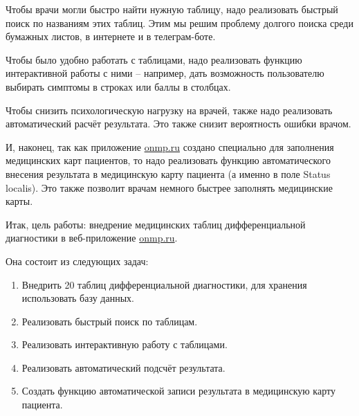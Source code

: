 Чтобы врачи могли быстро найти нужную таблицу, надо реализовать быстрый поиск по названиям этих таблиц. Этим мы решим проблему долгого поиска среди бумажных листов, в интернете и в телеграм-боте.

Чтобы было удобно работать с таблицами, надо реализовать функцию интерактивной работы с ними -- например, дать возможность пользователю выбирать симптомы в строках или баллы в столбцах.

Чтобы снизить психологическую нагрузку на врачей, также надо реализовать автоматический расчёт результата. Это также снизит вероятность ошибки врачом.

И, наконец, так как приложение \url{onmp.ru} создано специально для заполнения медицинских карт пациентов, то надо реализовать функцию автоматического внесения результата в медицинскую карту пациента (а именно в поле Status localis). Это также позволит врачам немного быстрее заполнять медицинские карты.

Итак, цель работы: внедрение медицинских таблиц дифференциальной диагностики в веб-приложение \url{onmp.ru}.

Она состоит из следующих задач:

\begin{enumerate}
  \item Внедрить 20 таблиц дифференциальной диагностики, для хранения использовать базу данных.
  \item Реализовать быстрый поиск по таблицам.
  \item Реализовать интерактивную работу с таблицами.
  \item Реализовать автоматический подсчёт результата.
  \item Создать функцию автоматической записи результата в медицинскую карту пациента.
\end{enumerate}